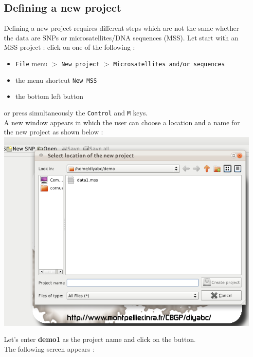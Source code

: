 

\subsection{Defining a new project}
Defining a new project requires different steps which are not the same whether the data are SNPs or microsatellites/DNA sequences (MSS). 
Let start with an MSS project : click on one of the following :
\begin{itemize}
 \item \texttt{File} menu $>$ \texttt{New project} $>$ \texttt{Microsatellites and/or sequences}
 \item the menu shortcut \texttt{New MSS}
 \item the bottom left button 
\end{itemize}
or press simultaneously the \texttt{Control} and \texttt{M} keys.\\
A new window appears in which the user can choose a location and a name for the new project as shown below :\\

\includegraphics[scale=0.35]{gui_pictures/Capture-DIYABC-7.png} 

Let's enter \textbf{demo1} as the project name and click on the  button.\\
The following screen appears :\\

